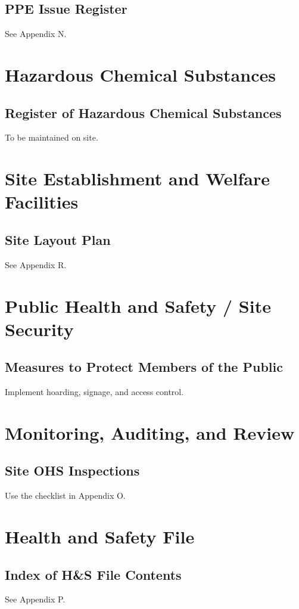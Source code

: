 \documentclass[12pt]{article}
\begin{document}
\subsection{PPE Issue Register}
See Appendix N.

\section{Hazardous Chemical Substances}

\subsection{Register of Hazardous Chemical Substances}
To be maintained on site.

\section{Site Establishment and Welfare Facilities}

\subsection{Site Layout Plan}
See Appendix R.

\section{Public Health and Safety / Site Security}

\subsection{Measures to Protect Members of the Public}
Implement hoarding, signage, and access control.

\section{Monitoring, Auditing, and Review}

\subsection{Site OHS Inspections}
Use the checklist in Appendix O.

\section{Health and Safety File}

\subsection{Index of H\&S File Contents}
See Appendix P.
\end{document}

